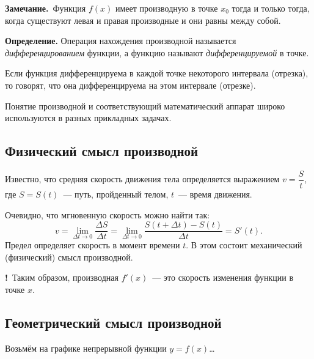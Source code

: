 \documentclass[a4paper,11pt]{article}
\newcommand{\imp}{\textbf{\color{red!70!black}!}\ }
\newcommand{\zam}{\textbf{Замечание.}\ }
\begin{document}
\zam Функция $f(x)$ имеет производную в точке $x_0$ тогда и только тогда, когда существуют левая
и правая производные и они равны между собой.

\begin{opr}
\textbf{Определение.} Операция нахождения производной называется \emph{дифференцированием} функции,
а функцию называют \emph{дифференцируемой} в точке.

Если функция дифференцируема в каждой точке некоторого интервала (отрезка), то говорят, что она
дифференцируема на этом интервале (отрезке).
\end{opr}

Понятие производной и соответствующий математический аппарат широко используются в разных
прикладных задачах.

\subsection{Физический смысл производной}

Известно, что средняя скорость движения тела определяется выражением $v = \dfrac{S}{t}$, где
$S = S(t)$~--- путь, пройденный телом, $t$~--- время движения.

Очевидно, что мгновенную скорость можно найти так:
\[
  v = \lim_{\Delta t \to 0} \frac{\Delta S}{\Delta t}
    = \lim_{\Delta t \to 0} \frac{S(t + \Delta t) - S(t)}{\Delta t} = S'(t).
\]
Предел определяет скорость в момент времени $t$. В этом состоит механический (физический) смысл
производной.

\imp Таким образом, производная $f'(x)$~--- это скорость изменения функции в точке $x$.

\subsection{Геометрический смысл производной}

Возьмём на графике непрерывной функции $y = f(x)$\dots
\end{document}
